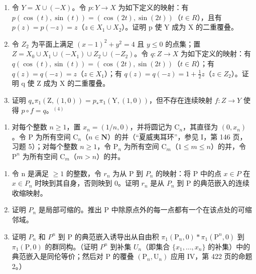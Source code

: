 \begin{enumerate}
\def\labelenumi{\alph{enumi})}
\item
  令 \(Y = X \cup (-X)\)。令 \(p: Y \to X\) 为如下定义的映射：有 \(p(\cos(t), \sin(t)) = (\cos(2t), \sin(2t))\)（\(t \in R\)），且有 \(p(z) = p(-z) = z\)（\(z \in X_{1} \cup X_{2}\)）。证明 p 使 Y 成为 X 的二重覆叠。
\item
  令 \(Z_{2}\) 为平面上满足 \((x-1)^{2}+y^{2}=4\) 且 \(y\leqslant0\) 的点集；置 \(Z=X_{0}\cup X_{1}\cup(-X_{1})\cup Z_{2}\cup(-Z_{2})\)。令 \(q:Z\to X\) 为如下定义的映射：有 \(q(\cos(t),\sin(t))=(\cos(2t),\sin(2t))\)（\(t\in R\)）；有 \(q(z)=q(-z)=z\)（\(z\in X_{1}\)）；有 \(q(z)=q(-z)=1+\frac{1}{2}z\)（\(z\in Z_{2}\)）。证明 q 使 Z 成为 X 的二重覆叠。
\item
  证明 \(q_{*}\pi_{1}(\mathrm{Z},(1,0)) = p_{*}\pi_{1}(\mathrm{Y},(1,0))\)，但不存在连续映射 \(f\colon Z \to Y\) 使得 \(p \circ f = q\)。\(^{(4)}\)
\end{enumerate}

\begin{enumerate}
\def\labelenumi{\arabic{enumi})}
\setcounter{enumi}{5}
\tightlist
\item
  对每个整数 \(n \geqslant 1\)，置 \(x_{n} = (1/n,0)\)，并将圆记为 \(\mathrm{C}_{n}\)，其直径为 \((0,x_{n})\)。令 P 为所有空间 \(\mathrm{C}_{n}\)（\(n \in \mathbf{N}\)）的并（“夏威夷耳环”，参见 I，第 146 页，习题 5）；对每个整数 \(n \geqslant 1\)，令 \(\mathrm{P}_{n}\) 为所有空间 \(\mathrm{C}_{m}\)（\(1 \leqslant m \leqslant n\)）的并，令 \(\mathrm{P}^{n}\) 为所有空间 \(\mathrm{C}_{m}\)（\(m > n\)）的并。
\end{enumerate}

\begin{enumerate}
\def\labelenumi{\alph{enumi})}
\item
  令 n 是满足 \(\geqslant 1\) 的整数，令 \(r_{n}\) 为从 P 到 \(P_{n}\) 的映射：将 P 中的点 \(x \in P\) 在 \(x \in P_{n}\) 时映到其自身，否则映到 0。证明 \(r_{n}\) 是从 \(P_{n}\) 到 P 的典范嵌入的连续收缩映射。
\item
  证明 \(P_{n}\) 是局部可缩的。推出 P 中除原点外的每一点都有一个在该点处的可缩邻域。
\item
  证明 \(P_{n}\) 和 \(P^{n}\) 到 P 的典范嵌入诱导出从自由积 \(\pi_{1}(\mathrm{P}_{n},0)*\pi_{1}(\mathrm{P}^{n},0)\) 到 \(\pi_{1}(\mathrm{P},0)\) 的群同构。（证明 \(P^{n}\) 到补集 \(U_{n}\)（即集合 \(\{x_{1},\ldots,x_{n}\}\) 的补集）中的典范嵌入是同伦等价；然后对 P 的覆叠 \((\mathrm{P}_{n},\mathrm{U}_{n})\) 应用 IV，第 422 页的命题 2。）
\end{enumerate}

